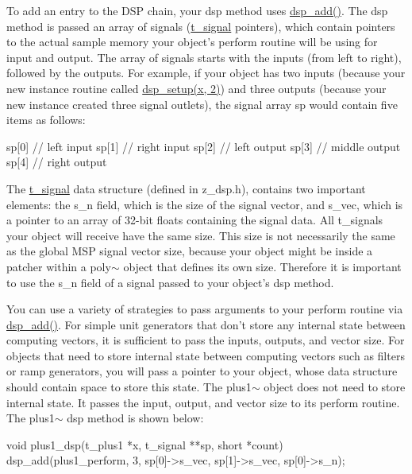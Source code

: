 To add an entry to the DSP chain, your dsp method uses \hyperlink{group__msp_gae9a75fa230b1db6d8316405d4a6065cc}{dsp\_\-add()}. The dsp method is passed an array of signals (\hyperlink{structt__signal}{t\_\-signal} pointers), which contain pointers to the actual sample memory your object's perform routine will be using for input and output. The array of signals starts with the inputs (from left to right), followed by the outputs. For example, if your object has two inputs (because your new instance routine called \hyperlink{group__msp_gad15f054306792846a00a5f4e9e5426be}{dsp\_\-setup(x, 2)}) and three outputs (because your new instance created three signal outlets), the signal array sp would contain five items as follows: 
\begin{DoxyCode}
    sp[0] // left input
    sp[1] // right input
    sp[2] // left output
    sp[3] // middle output
    sp[4] // right output
\end{DoxyCode}


The \hyperlink{structt__signal}{t\_\-signal} data structure (defined in z\_\-dsp.h), contains two important elements: the s\_\-n field, which is the size of the signal vector, and s\_\-vec, which is a pointer to an array of 32-\/bit floats containing the signal data. All t\_\-signals your object will receive have the same size. This size is not necessarily the same as the global MSP signal vector size, because your object might be inside a patcher within a poly$\sim$ object that defines its own size. Therefore it is important to use the s\_\-n field of a signal passed to your object's dsp method.

You can use a variety of strategies to pass arguments to your perform routine via \hyperlink{group__msp_gae9a75fa230b1db6d8316405d4a6065cc}{dsp\_\-add()}. For simple unit generators that don't store any internal state between computing vectors, it is sufficient to pass the inputs, outputs, and vector size. For objects that need to store internal state between computing vectors such as filters or ramp generators, you will pass a pointer to your object, whose data structure should contain space to store this state. The plus1$\sim$ object does not need to store internal state. It passes the input, output, and vector size to its perform routine. The plus1$\sim$ dsp method is shown below:


\begin{DoxyCode}
    void plus1_dsp(t_plus1 *x, t_signal **sp, short *count)
    {
        dsp_add(plus1_perform, 3, sp[0]->s_vec, sp[1]->s_vec, sp[0]->s_n);
    }
\end{DoxyCode}


